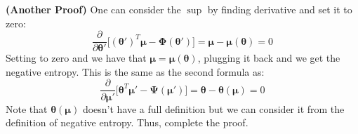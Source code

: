 \begin{remark}{\textbf{(Another Proof)}}
    One can consider the $\sup$ by finding derivative and set it to zero:
    \begin{equation*}
        \frac{\partial}{\partial \boldsymbol \theta'} \Big[ (\boldsymbol \theta')^T\boldsymbol \mu - \boldsymbol \Phi(\boldsymbol \theta') \Big] = \boldsymbol \mu - \boldsymbol \mu(\boldsymbol \theta) = 0
    \end{equation*}
    Setting to zero and we have that $\boldsymbol \mu = \boldsymbol \mu(\boldsymbol \theta)$, plugging it back and we get the negative entropy. This is the same as the second formula as:
    \begin{equation*}
        \frac{\partial}{\partial \boldsymbol \mu'} \Big[ \boldsymbol \theta^T\boldsymbol \mu' - \boldsymbol \Psi(\boldsymbol \mu') \Big] = \boldsymbol \theta - \boldsymbol \theta(\boldsymbol \mu) = 0
    \end{equation*}
    Note that $\boldsymbol \theta(\boldsymbol \mu)$ doesn't have a full definition but we can consider it from the definition of negative entropy. Thus, complete the proof.
\end{remark}

